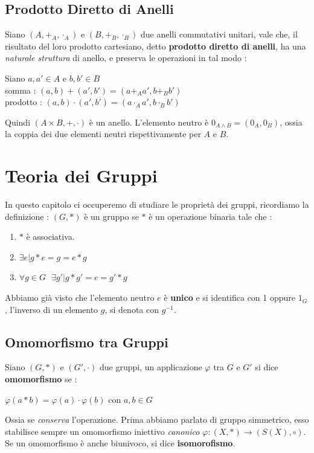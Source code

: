 \documentclass[12pt, letterpaper]{article}
\begin{document}
\subsection{Prodotto Diretto di Anelli}
Siano  \((A,+_A,\cdot_A)\) e \((B,+_B,\cdot_B)\) due anelli commutativi unitari, vale che, il risultato del loro
prodotto cartesiano, detto \textbf{prodotto diretto di anelli}, ha una \textit{naturale struttura} di anello, e preserva le operazioni in tal modo :\begin{center}
    Siano \(a,a'\in A\) e \(b,b'\in B\) \\
    somma : \((a,b)+(a',b')=(a+_A a',b+_B b')\)\\
    prodotto : \((a,b)\cdot(a',b')=(a\cdot_A a',b\cdot_B b')\)
\end{center}
Quindi \((A\times B,+,\cdot)\) è un anello.
L'elemento neutro è \(0_{A\land B}=(0_A,0_B)\), ossia la coppia dei due elementi neutri rispettivamente per \(A\) e \(B\).

\section{Teoria dei Gruppi}\label{teoGruppi}
In questo capitolo ci occuperemo di studiare le proprietà dei gruppi, ricordiamo la definizione :
\((G,*)\) è un gruppo se \(*\) è un operazione binaria tale che : \begin{enumerate}
    \item \(*\) è associativa.
    \item \(\exists e|g*e=g=e*g\)
    \item \(\forall g\in G \text{ } \exists g' | g*g'=e=g'*g\)
\end{enumerate}
Abbiamo già visto che l'elemento neutro \(e\) è \textbf{unico} e si identifica con 1 oppure \(1_G\), l'inverso di un 
elemento \(g\), si denota con \(g^{-1}\).
 \subsection{Omomorfismo tra Gruppi}
 Siano \((G,*)\) e \((G',\cdot)\) due gruppi, un applicazione \(\varphi\) tra \(G\) e \(G'\) si dice \textbf{omomorfismo}
  se :\begin{center}
    \(
        \varphi(a*b)=\varphi(a)\cdot \varphi(b) \text{ con }a,b\in G  
    \)
  \end{center}
Ossia se \textit{conserva} l'operazione. Prima abbiamo parlato di gruppo simmetrico, esso stabilisce sempre un 
omomorfismo iniettivo \textit{canonico} \(\varphi : (X,*)\rightarrow (S(X),\circ)\). Se un omomorfismo è anche 
biunivoco, si dice \textbf{isomorofismo}.
\end{document}
